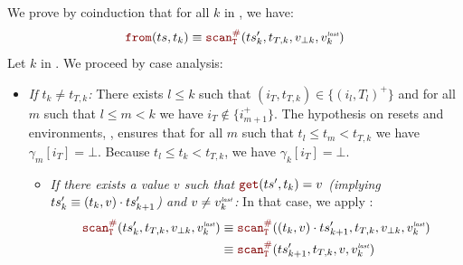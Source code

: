 \begin{skippableproof}
    We prove by coinduction that for all $k$ in \N, we have:
    \begin{equation*}
        \from{\ts}{t_k} \equiv \scanAux{\ts'_k}{T}{t_{T, k}}{v_{\bot k}}{v^\explast_k}
    \end{equation*}
    Let $k$ in \N. We proceed by case analysis:
    \begin{itemize}
        \item \textit{If $t_k \neq t_{T, k}$:} There exists $l \le k$ such that $(i_T, t_{T, k})
                  \in \{(i_l, T_l)^+\}$ and for all $m$ such that $l \le m < k$ we have
              $i_T \notin \{i_{m+1}^+\}$. The hypothesis on resets and environments,
              , ensures that for all $m$ such that
              $t_l \le t_m < t_{T, k}$ we have $\gamma_m[i_T] = \bot$. Because
              $t_l \le t_k < t_{T, k}$, we have $\gamma_k[i_T] = \bot$.

              \begin{itemize}
                  \item \textit{If there exists a value $v$ such that $\getAt{\ts'}{t_k} = v$
                        (implying $ts'_k \equiv (t_k, v) \cdot ts'_{k+1}$) and $v \neq v^{\textit{\tiny last}}_k$:}
                        In that case, we apply :
                        \begin{align*}
                            \scanAux{\ts'_k}{T}{t_{T, k}}{v_{\bot k}}{v^\explast_k} & \equiv
                            \scanAux{(t_k, v) \next \ts'_{k+1}}{T}{t_{T, k}}{v_{\bot k}}{v^\explast_k} \\
                                                                                    & \equiv
                            \scanAux{\ts'_{k+1}}{T}{t_{T, k}}{v}{v^\explast_k}
                        \end{align*}


\end{itemize}
\end{itemize}
\end{skippableproof}
